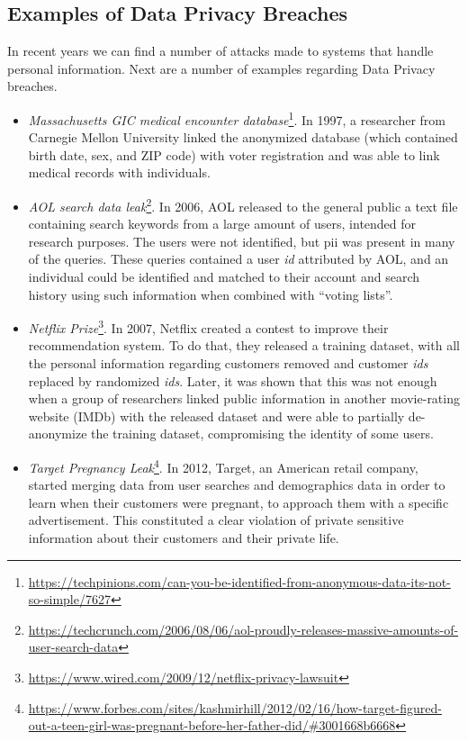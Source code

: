 \subsection{Examples of Data Privacy Breaches}
\label{ssec:ExamplesDataPrivacyBreaches}


In recent years we can find a number of attacks made to systems that handle personal information. Next are a number of examples regarding Data Privacy breaches.

\begin{itemize}
	
	\item \textit{Massachusetts GIC medical encounter database}\footnote{\url{https://techpinions.com/can-you-be-identified-from-anonymous-data-its-not-so-simple/7627}}. In 1997, a researcher from Carnegie Mellon University linked the anonymized database (which contained birth date, sex, and ZIP code) with voter registration and was able to link medical records with individuals.

	\item \textit{AOL search data leak}\footnote{\url{https://techcrunch.com/2006/08/06/aol-proudly-releases-massive-amounts-of-user-search-data}}. In 2006, AOL released to the general public a text file containing search keywords from a large amount of users, intended for research purposes. The users were not identified, but \ac{pii} was present in many of the queries. These queries contained a user \textit{id} attributed by AOL, and an individual could be identified and matched to their account and search history using such information when combined with ``voting lists''.

	\item \textit{Netflix Prize}\footnote{\url{https://www.wired.com/2009/12/netflix-privacy-lawsuit}}. In 2007, Netflix created a contest to improve their recommendation system. To do that, they released a training dataset, with all the personal information regarding customers removed and customer \textit{ids} replaced by randomized \textit{ids}. Later, it was shown that this was not enough when a group of researchers linked public information in another movie-rating website (IMDb) with the released dataset and were able to partially de-anonymize the training dataset, compromising the identity of some users.

	\item \textit{Target Pregnancy Leak}\footnote{\url{https://www.forbes.com/sites/kashmirhill/2012/02/16/how-target-figured-out-a-teen-girl-was-pregnant-before-her-father-did/\#3001668b6668}}. In 2012, Target, an American retail company, started merging data from user searches and demographics data in order to learn when their customers were pregnant, to approach them with a specific advertisement. This constituted a clear violation of private sensitive information about their customers and their private life.


\end{itemize}